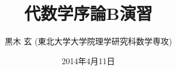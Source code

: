 \documentclass[12pt,twoside]{jarticle}
\begin{document}

\title{\bf 代数学序論B演習}
\author{黒木 玄 \quad (東北大学大学院理学研究科数学専攻)}
\date{2014年4月11日}

\maketitle

\tableofcontents


%
%
%
%
%
%
\end{document}
